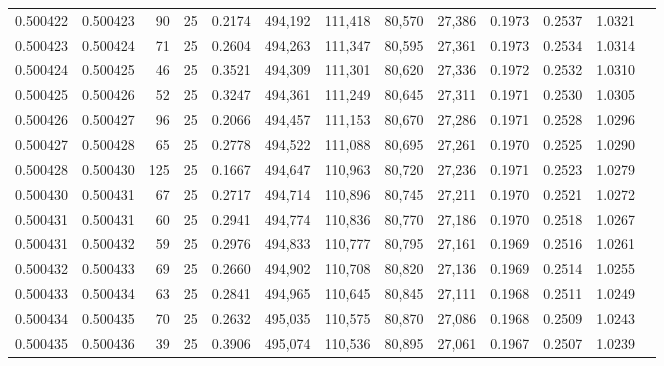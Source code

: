 \begin{tabular}{rrrrrrrrrrrrr}
0.500422 & 0.500423 &  90 &  25 &                                     0.2174 & 494,192 & 111,418 &  80,570 &  27,386 & 0.1973 & 0.2537 & 1.0321 \\
0.500423 & 0.500424 &  71 &  25 &                                     0.2604 & 494,263 & 111,347 &  80,595 &  27,361 & 0.1973 & 0.2534 & 1.0314 \\
0.500424 & 0.500425 &  46 &  25 &                                     0.3521 & 494,309 & 111,301 &  80,620 &  27,336 & 0.1972 & 0.2532 & 1.0310 \\
0.500425 & 0.500426 &  52 &  25 &                                     0.3247 & 494,361 & 111,249 &  80,645 &  27,311 & 0.1971 & 0.2530 & 1.0305 \\
0.500426 & 0.500427 &  96 &  25 &                                     0.2066 & 494,457 & 111,153 &  80,670 &  27,286 & 0.1971 & 0.2528 & 1.0296 \\
0.500427 & 0.500428 &  65 &  25 &                                     0.2778 & 494,522 & 111,088 &  80,695 &  27,261 & 0.1970 & 0.2525 & 1.0290 \\
0.500428 & 0.500430 & 125 &  25 &                                     0.1667 & 494,647 & 110,963 &  80,720 &  27,236 & 0.1971 & 0.2523 & 1.0279 \\
0.500430 & 0.500431 &  67 &  25 &                                     0.2717 & 494,714 & 110,896 &  80,745 &  27,211 & 0.1970 & 0.2521 & 1.0272 \\
0.500431 & 0.500431 &  60 &  25 &                                     0.2941 & 494,774 & 110,836 &  80,770 &  27,186 & 0.1970 & 0.2518 & 1.0267 \\
0.500431 & 0.500432 &  59 &  25 &                                     0.2976 & 494,833 & 110,777 &  80,795 &  27,161 & 0.1969 & 0.2516 & 1.0261 \\
0.500432 & 0.500433 &  69 &  25 &                                     0.2660 & 494,902 & 110,708 &  80,820 &  27,136 & 0.1969 & 0.2514 & 1.0255 \\
0.500433 & 0.500434 &  63 &  25 &                                     0.2841 & 494,965 & 110,645 &  80,845 &  27,111 & 0.1968 & 0.2511 & 1.0249 \\
0.500434 & 0.500435 &  70 &  25 &                                     0.2632 & 495,035 & 110,575 &  80,870 &  27,086 & 0.1968 & 0.2509 & 1.0243 \\
0.500435 & 0.500436 &  39 &  25 &                                     0.3906 & 495,074 & 110,536 &  80,895 &  27,061 & 0.1967 & 0.2507 & 1.0239 \\

\end{tabular}
